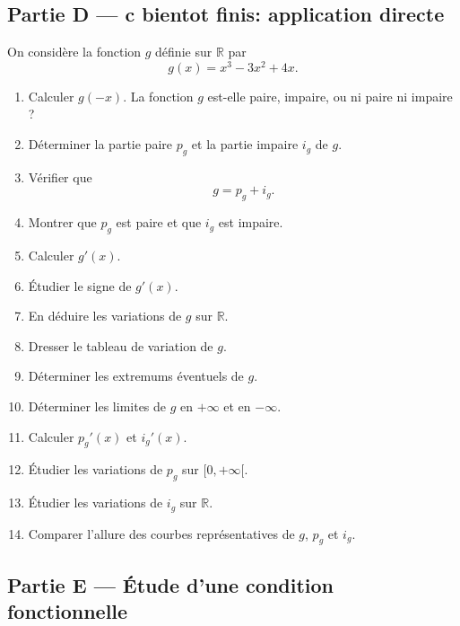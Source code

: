 \documentclass[11pt,a4paper]{article}
\newcommand{\R}{\mathbb{R}}
\begin{document}
\subsection*{Partie D --- c bientot finis: application directe}

On considère la fonction \(g\) définie sur \(\R\) par
\[
g(x)=x^3-3x^2+4x.
\]

\begin{enumerate}[label=\arabic*.]
    \item Calculer \(g(-x)\).  
    La fonction \(g\) est-elle paire, impaire, ou ni paire ni impaire ?

    \item Déterminer la partie paire \(p_g\) et la partie impaire \(i_g\) de \(g\).

    \item Vérifier que
    \[
    g=p_g+i_g.
    \]

    \item Montrer que \(p_g\) est paire et que \(i_g\) est impaire.

    \item Calculer \(g'(x)\).

    \item Étudier le signe de \(g'(x)\).

    \item En déduire les variations de \(g\) sur \(\R\).

    \item Dresser le tableau de variation de \(g\).

    \item Déterminer les extremums éventuels de \(g\).

    \item Déterminer les limites de \(g\) en \(+\infty\) et en \(-\infty\).

    \item Calculer \(p_g'(x)\) et \(i_g'(x)\).

    \item Étudier les variations de \(p_g\) sur \([0,+\infty[\).

    \item Étudier les variations de \(i_g\) sur \(\R\).

    \item Comparer l’allure des courbes représentatives de \(g\), \(p_g\) et \(i_g\).
\end{enumerate}
\subsection*{Partie E --- Étude d’une condition fonctionnelle}
\end{document}
